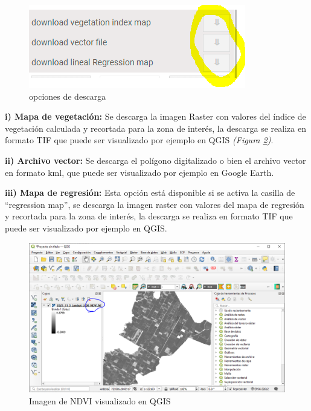 \documentclass[
]{book}
\begin{document}
\begin{figure}

{\centering \includegraphics{./images/Figure62} 

}

\caption{opciones de descarga}\label{fig:figI12}
\end{figure}

\textbf{i) Mapa de vegetación:} Se descarga la imagen Raster con valores del índice de vegetación calculada y recortada para la zona de interés, la descarga se realiza en formato TIF que puede ser visualizado por ejemplo en QGIS \emph{(Figura \ref{fig:figI13})}.

\textbf{ii) Archivo vector:} Se descarga el polígono digitalizado o bien el archivo vector en formato kml, que puede ser visualizado por ejemplo en Google Earth.

\textbf{iii) Mapa de regresión:} Esta opción está disponible si se activa la casilla de ``regression map'', se descarga la imagen raster con valores del mapa de regresión y recortada para la zona de interés, la descarga se realiza en formato TIF que puede ser visualizado por ejemplo en QGIS.

\begin{figure}

{\centering \includegraphics[width=0.85\linewidth]{./images/Figure63} 

}

\caption{Imagen de NDVI visualizado en QGIS}\label{fig:figI13}
\end{figure}
\end{document}
